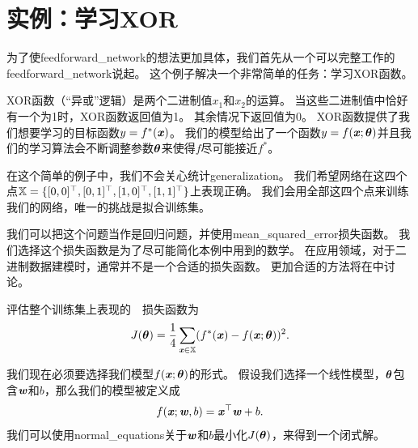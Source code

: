 \section{实例：学习XOR}
\label{sec:example_learning_xor}

为了使\gls{feedforward_network}的想法更加具体，我们首先从一个可以完整工作的\gls{feedforward_network}说起。
这个例子解决一个非常简单的任务：学习XOR函数。

XOR函数（``异或''逻辑）是两个二进制值$x_1$和$x_2$的运算。
当这些二进制值中恰好有一个为1时，XOR函数返回值为1。
其余情况下返回值为0。
XOR函数提供了我们想要学习的目标函数$y = f^*(\boldsymbol{\mathit{x}})$。
我们的模型给出了一个函数$y=f(\boldsymbol{\mathit{x}}; \boldsymbol{\theta})$并且我们的学习算法会不断调整参数$\boldsymbol{\theta}$来使得$f$尽可能接近$f^*$。

在这个简单的例子中，我们不会关心统计\gls{generalization}。
我们希望网络在这四个点$\mathbb{X} =\{[0, 0]^\top, [0, 1]^\top, [1, 0]^\top, [1, 1]^\top\}$上表现正确。
我们会用全部这四个点来训练我们的网络，唯一的挑战是拟合训练集。

我们可以把这个问题当作是回归问题，并使用\gls{mean_squared_error}损失函数。
我们选择这个损失函数是为了尽可能简化本例中用到的数学。
在应用领域，对于二进制数据建模时，通常并不是一个合适的损失函数。
更加合适的方法将在中讨论。


评估整个训练集上表现的~~损失函数为
\begin{equation}
J(\boldsymbol{\theta}) = \frac{1}{4} \sum_{\boldsymbol{\mathit{x}}\in \mathbb{X}} (f^*(\boldsymbol{\mathit{x}}) - f(\boldsymbol{\mathit{x}}; \boldsymbol{\theta}))^2.
\end{equation}

我们现在必须要选择我们模型$f(\boldsymbol{\mathit{x}}; \boldsymbol{\theta})$的形式。
假设我们选择一个线性模型，$\boldsymbol{\theta}$包含$\boldsymbol{\mathit{w}}$和$b$，那么我们的模型被定义成
\begin{equation}
f(\boldsymbol{\mathit{x}}; \boldsymbol{\mathit{w}}, b) = \boldsymbol{\mathit{x}}^\top \boldsymbol{\mathit{w}} + b.
\end{equation}
我们可以使用\gls{normal_equations}关于$\boldsymbol{\mathit{w}}$和$b$最小化$J(\boldsymbol{\theta})$，来得到一个闭式解。

